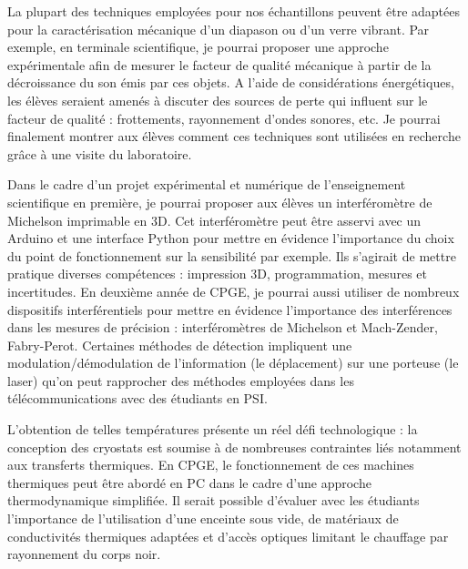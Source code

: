 \documentclass[12pt,a4paper]{article}
\newenvironment{mep}{%
\addcontentsline{ldf}{figure}{0}%
\begin{mep_env}
\small}
{\end{mep_env}}
\begin{document}

La plupart des techniques employées pour nos échantillons peuvent être adaptées pour la caractérisation mécanique d'un diapason ou d'un verre vibrant.
Par exemple, en terminale scientifique, je pourrai proposer une approche expérimentale afin de mesurer le facteur de qualité mécanique à partir de la décroissance du son émis par ces objets.
A l'aide de considérations énergétiques, les élèves seraient amenés à discuter des sources de perte qui influent sur le facteur de qualité : frottements, rayonnement d'ondes sonores, etc.
Je pourrai finalement montrer aux élèves comment ces techniques sont utilisées en recherche grâce à une visite du laboratoire.

Dans le cadre d'un projet expérimental et numérique de l'enseignement scientifique en première, je pourrai proposer aux élèves un interféromètre de Michelson imprimable en 3D.
Cet interféromètre peut être asservi avec un Arduino et une interface Python pour mettre en évidence l'importance du choix du point de fonctionnement sur la sensibilité par exemple.
Ils s'agirait de mettre pratique diverses compétences : impression 3D, programmation, mesures et incertitudes.
En deuxième année de CPGE, je pourrai aussi utiliser de nombreux dispositifs interférentiels pour mettre en évidence l'importance des interférences dans les mesures de précision : interféromètres de Michelson et Mach-Zender, Fabry-Perot.
Certaines méthodes de détection impliquent une modulation/démodulation de l'information (le déplacement) sur une porteuse (le laser) qu'on peut rapprocher des méthodes employées dans les télécommunications avec des étudiants en PSI.

L'obtention de telles températures présente un réel défi technologique : la conception des cryostats est soumise à de nombreuses contraintes liés notamment aux transferts thermiques.
En CPGE, le fonctionnement de ces machines thermiques peut être abordé en PC dans le cadre d'une approche thermodynamique simplifiée.
Il serait possible d'évaluer avec les étudiants l'importance de l'utilisation d'une enceinte sous vide, de matériaux de conductivités thermiques adaptées et d'accès optiques limitant le chauffage par rayonnement du corps noir.
\end{document}
